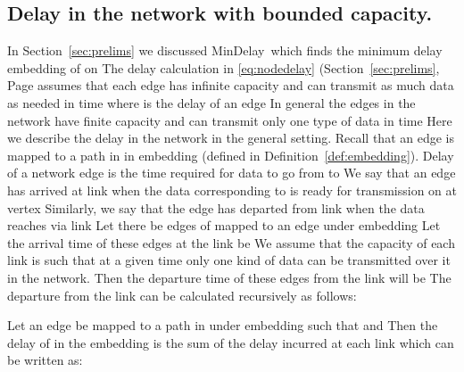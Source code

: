 \documentclass[journal]{IEEEtran}
\newcommand{\mindelay}{\textsf{MinDelay}}
\begin{document}
\subsection{Delay in the network with bounded capacity.}

In Section~\ref{sec:prelims} we discussed \mindelay\ which finds the
minimum delay embedding of  on  The delay
calculation in \eqref{eq:nodedelay} (Section~\ref{sec:prelims}, Page
 assumes that each edge  has infinite
capacity and can transmit as much data as needed in time  where
 is the delay of an edge  In general the edges in the
network have finite capacity and can transmit only one type of data in
time  Here we describe the delay in the network in the general
setting. Recall that an edge  is mapped to a
path in  in embedding  (defined in
Definition~\ref{def:embedding}). Delay of a network edge  is the
time required for data to go from  to  We say that an edge
 has arrived at link  when the data
corresponding to  is ready for transmission on  at vertex
 Similarly, we say that the edge  has departed from link
 when the data reaches  via link  Let there be  edges
 of  mapped to an edge  under embedding  Let the arrival time of these
edges at the link  be  We assume that the capacity of each link is such
that at a given time only one kind of data can be transmitted over it
in the network. Then the departure time of these edges from the link
will be  The
departure from the link  can be calculated recursively as follows:

Let an edge  be mapped to
a path  in  under embedding 
such that  and  Then the delay of  in the embedding is the sum of the
delay incurred at each link  which
can be written as:
 
\end{document}

